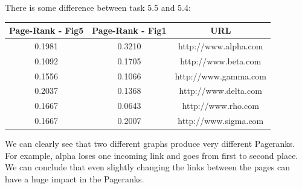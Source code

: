 \documentclass[unicode,11pt,a4paper,oneside,numbers=endperiod,openany]{scrartcl}
\begin{document}
\begin{enumerate}
    There is some difference between task 5.5 and 5.4:
    \begin{center}
         \begin{tabular}{||c | c | c||} 
         \hline
         Page-Rank - Fig5 & Page-Rank - Fig1 & URL \\ [0.5ex] 
         \hline\hline
         0.1981 & 0.3210 & http://www.alpha.com \\
         \hline
         0.1092 & 0.1705 & http://www.beta.com \\
         \hline
         0.1556 & 0.1066 & http://www.gamma.com \\
         \hline
         0.2037 & 0.1368 & http://www.delta.com \\ 
         \hline
         0.1667 & 0.0643 & http://www.rho.com \\
         \hline
         0.1667 & 0.2007 & http://www.sigma.com \\
         \hline
        \end{tabular}
        \end{center}
    We can clearly see that two different graphs produce very different Pageranks. For example, alpha loses one incoming link and goes from first to second place. We can conclude that even slightly changing the links between the pages can have a huge impact in the Pageranks.
    

\end{enumerate}
\end{document}
